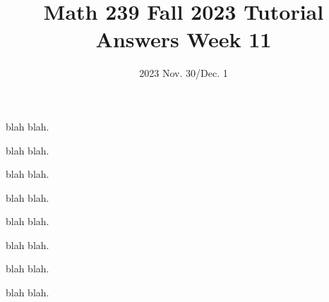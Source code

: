 \title{Math 239 Fall 2023 Tutorial Answers Week 11}

\date{2023 Nov. 30/Dec. 1}
\maketitle

\begin{enumerate}
     blah blah.

  
     blah blah.

   
     blah blah.


     blah blah.

      blah blah.

  
     blah blah.

   
     blah blah.


     blah blah.

\end{enumerate}